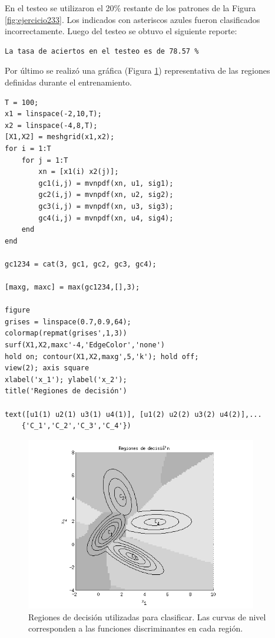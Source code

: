 \documentclass[11pt,a4paper,final]{article}
\begin{document}
En el testeo se utilizaron el 20\% restante de los patrones de la Figura \ref{fig:ejercicio233}. Los indicados con asteriscos azules fueron clasificados incorrectamente. Luego del testeo se obtuvo el siguiente reporte:

\color{lightgray} \begin{verbatim}La tasa de aciertos en el testeo es de 78.57 %
\end{verbatim} \color{black}
    
Por último se realizó una gráfica (Figura \ref{fig:ejercicio234}) representativa de las regiones definidas durante el entrenamiento.

\begin{verbatim}
T = 100;
x1 = linspace(-2,10,T);
x2 = linspace(-4,8,T);
[X1,X2] = meshgrid(x1,x2);
for i = 1:T
    for j = 1:T
        xn = [x1(i) x2(j)];
        gc1(i,j) = mvnpdf(xn, u1, sig1);
        gc2(i,j) = mvnpdf(xn, u2, sig2);
        gc3(i,j) = mvnpdf(xn, u3, sig3);
        gc4(i,j) = mvnpdf(xn, u4, sig4);
    end
end

gc1234 = cat(3, gc1, gc2, gc3, gc4);

[maxg, maxc] = max(gc1234,[],3);

figure
grises = linspace(0.7,0.9,64);
colormap(repmat(grises',1,3))
surf(X1,X2,maxc'-4,'EdgeColor','none')
hold on; contour(X1,X2,maxg',5,'k'); hold off;
view(2); axis square
xlabel('x_1'); ylabel('x_2');
title('Regiones de decisión')

text([u1(1) u2(1) u3(1) u4(1)], [u1(2) u2(2) u3(2) u4(2)],...
    {'C_1','C_2','C_3','C_4'})
\end{verbatim}

\begin{figure}[h]
\includegraphics [width=0.9\textwidth]{Ejercicio2_04.png}
\caption{Regiones de decisión utilizadas para clasificar. Las curvas de nivel corresponden a las funciones discriminantes en cada región.}
\label{fig:ejercicio234}
\end{figure}
\end{document}
